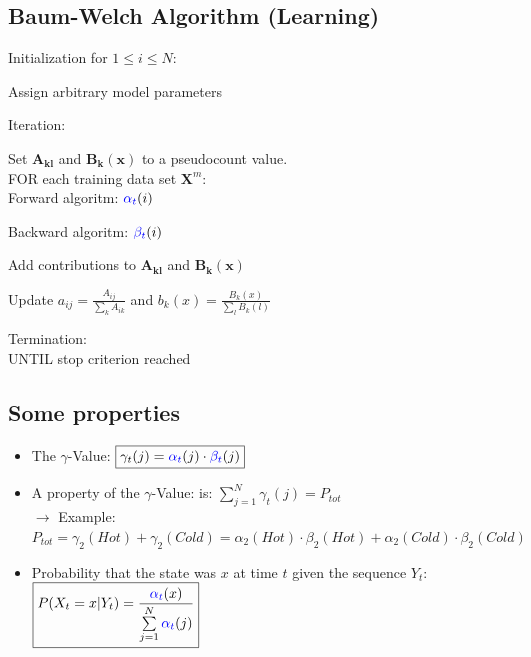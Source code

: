 \begin{minipage}[t]{0.49\textwidth}

\subsection{Baum-Welch Algorithm (Learning)}

\begin{aufzaehlung}
	\item Initialization for $1\leq i \leq N$:\\
	
	\vspace{-0.3cm}
	
	Assign arbitrary model parameters\\

	\item Iteration:\\
			
	\vspace{-0.3cm}
	
	Set $\bm{A_{kl}}$ and $\bm{B_{k}(x)}$ to a pseudocount value.\\
	
	FOR  each training data set $\bm{X}^m$:\\
	
	\qquad Forward algoritm: $\textcolor{blue}{\alpha_t}(i)$
	
	\qquad Backward algoritm: $\textcolor{blue}{\beta_t}(i)$
	
	\qquad Add contributions to $\bm{A_{kl}}$ and $\bm{B_{k}(x)}$
	
	\qquad Update $a_{ij}=\frac{A_{ij}}{\sum\limits_{k}^{}{A_{ik}}}$ and $b_k(x)=\frac{B_k(x)}{\sum\limits_{l}^{}{B_{k}(l)}}$
	
	\item Termination:\\
		
	UNTIL stop criterion reached
		
\end{aufzaehlung}	 
\end{minipage}

\subsection{Some properties}
\begin{itemize}
	\item The $\gamma$-Value: $\boxed{\gamma_t(j)=\textcolor{blue}{\alpha_t}(j)\cdot\textcolor{blue}{\beta_t}(j)}$
	\item A property of the $\gamma$-Value: is: $\boxed{\sum\limits_{j=1}^{N}{\gamma_t(j)=P_{tot}}}$ \\  
	$\to$ Example: $P_{tot}=\gamma_2(Hot)+\gamma_2(Cold)=\alpha_2(Hot)\cdot\beta_2(Hot)+\alpha_2(Cold)\cdot\beta_2(Cold)$
	\item Probability that the state was $x$ at time $t$ given the sequence $Y_t$: $\boxed{P(X_t=x|Y_t)=\frac{\textcolor{blue}{\alpha_t}(x)}{\sum\limits_{j=1}^{N}{\textcolor{blue}{\alpha_t}(j)}}}$
\end{itemize}



